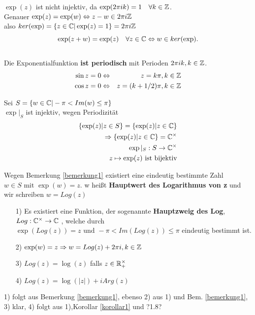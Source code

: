 \begin{bemerkung}\label{bemerkung1}
$\exp(z)$ ist nicht injektiv, da $\exp(2\pi i k ) = 1 \quad\forall k \in \mathbb{Z}$.\\
Genauer $ \exp(z) = \exp(w) \Leftrightarrow z-w \in 2\pi i \mathbb{Z}$ \\
also $ker( \exp) = \{z \in \mathbb{C}| \exp(z) = 1\} = 2\pi i \mathbb{Z}$ \\
\[\exp( z+w) = \exp( z) \quad\forall z \in \mathbb{C} \Leftrightarrow w \in ker (\exp).\]\\
Die Exponentialfunktion \textbf{ist periodisch} mit Perioden $2 \pi i k, k \in \mathbb{Z}$.\\
\begin{eqnarray*}
	\sin z = 0 &\Leftrightarrow & z = k\pi, k \in \mathbb{Z} \\
	\cos z = 0 &\Leftrightarrow & z = (k+ 1/2)\pi, k \in \mathbb{Z}
\end{eqnarray*}
\end{bemerkung}

Sei
$ S = \{ w \in \mathbb{C}| -\pi < Im(w) \leq \pi\}$\\
$\exp|_S$ ist injektiv, wegen Periodizität
\begin{eqnarray*}
	\{\exp(z)| z \in S\} = \{ \exp(z) | z \in \mathbb{C}\}\\
	\Rightarrow \{ \exp(z) | z \in \mathbb{C} \} = \mathbb{C}^{\times}\\
	\exp|_S: S \to \mathbb{C}^{\times}\\
	z \mapsto \exp (z) \text{ ist bijektiv}
\end{eqnarray*}

\begin{definition}
Wegen Bemerkung \ref{bemerkung1} existiert eine eindeutig bestimmte Zahl $w\in S \text{ mit } \exp(w)= z$. w heißt \textbf{Hauptwert des Logarithmus von z} und wir schreiben $w = Log(z) $
\end{definition}
\begin{satz}
	\leavevmode
\begin{itemize}
	\item[1)]
	Es existiert eine Funktion, der sogenannte \textbf{Hauptzweig des Log}, $ Log: \mathbb{C}^{\times} \to \mathbb{C}$ , welche durch $ \exp(Log(z)) = z \text{ und } -\pi< Im(Log (z)) \leq \pi$ eindeutig bestimmt ist.
	\item[2)]
	$\exp (w) = z \Rightarrow w = Log( z) + 2 \pi i , k \in \mathbb{Z}$
	\item[3)]
	$Log (z) = \log (z)$ falls $ z \in \mathbb{R}^{\times}_+$
	\item[4)]
	$Log (z) = \log(|z|) + i Arg(z)$
\end{itemize}
\end{satz}
\begin{bew}
1) folgt aus Bemerkung \ref{bemerkung1}, ebenso 2) aus 1) und Bem. \ref{bemerkung1}, 3) klar, 4) folgt aus 1),Korollar \ref{korollar1} und ?1.8?
\end{bew}